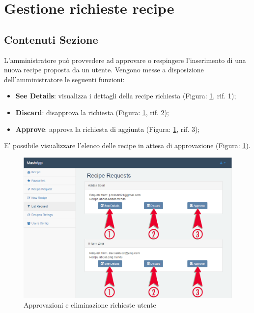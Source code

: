 %

\section{Gestione richieste recipe} %
\label{sec:gest_richieste}


	\subsection{Contenuti Sezione} %
	\label{sub:contenuti_sezione}
		L'amministratore può provvedere ad approvare o respingere l'inserimento di una nuova recipe\gloss{} proposta da un utente.\newline
		Vengono messe a disposizione dell'amministratore le seguenti funzioni:
		\begin{itemize}
			\item \textbf{See Details}: visualizza i dettagli della recipe richiesta (Figura: \ref{fig:richiesta_ricette}, rif. 1);
			\item \textbf{Discard}: disapprova la richiesta (Figura: \ref{fig:richiesta_ricette}, rif. 2);
			\item \textbf{Approve}: approva la richiesta di aggiunta (Figura: \ref{fig:richiesta_ricette}, rif. 3);
		\end{itemize}
		E' possibile visualizzare l'elenco delle recipe\gloss{} in attesa di approvazione (Figura: \ref{fig:richiesta_ricette}).
		\begin{figure}[H]
			\centering
			\centerline{\includegraphics[width=14cm]{images/richiesta_ricette.png}}
			\caption{Approvazioni e eliminazione richieste utente}
			\label{fig:richiesta_ricette}
		\end{figure}


